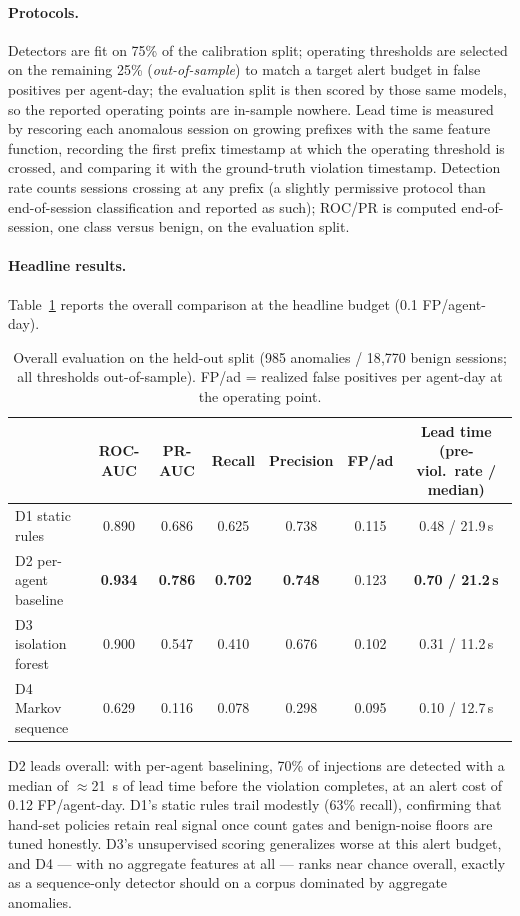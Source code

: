 \documentclass[10pt]{article}
\begin{document}
\paragraph{Protocols.} Detectors are fit on 75\% of the calibration split;
operating thresholds are selected on the remaining 25\% (\emph{out-of-sample})
to match a target alert budget in false positives per agent-day; the
evaluation split is then scored by those same models, so the reported
operating points are in-sample nowhere. Lead time is measured by rescoring
each anomalous session on growing prefixes with the same feature function,
recording the first prefix timestamp at which the operating threshold is
crossed, and comparing it with the ground-truth violation timestamp.
Detection rate counts sessions crossing at any prefix (a slightly permissive
protocol than end-of-session classification and reported as such); ROC/PR is
computed end-of-session, one class versus benign, on the evaluation split.

\paragraph{Headline results.} Table~\ref{tab:overall} reports the overall
comparison at the headline budget (0.1 FP/agent-day).

\begin{table}[t]
\centering\small
\caption{Overall evaluation on the held-out split (985 anomalies / 18{,}770
benign sessions; all thresholds out-of-sample). FP/ad = realized false
positives per agent-day at the operating point.}
\label{tab:overall}
\begin{tabular}{@{}lcccccc@{}}
\toprule
 & ROC-AUC & PR-AUC & Recall & Precision & FP/ad & Lead time (pre-viol.\ rate / median) \\
\midrule
D1 static rules      & 0.890 & 0.686 & 0.625 & 0.738 & 0.115 & 0.48 / 21.9\,s \\
D2 per-agent baseline& \textbf{0.934} & \textbf{0.786} & \textbf{0.702} & \textbf{0.748} & 0.123 & \textbf{0.70 / 21.2\,s} \\
D3 isolation forest  & 0.900 & 0.547 & 0.410 & 0.676 & 0.102 & 0.31 / 11.2\,s \\
D4 Markov sequence   & 0.629 & 0.116 & 0.078 & 0.298 & 0.095 & 0.10 / 12.7\,s \\
\bottomrule
\end{tabular}
\end{table}

\noindent D2 leads overall: with per-agent baselining, 70\% of injections are
detected with a median of $\approx$21~s of lead time before the violation
completes, at an alert cost of 0.12 FP/agent-day. D1's static rules trail
modestly (63\% recall), confirming that hand-set policies retain real signal
once count gates and benign-noise floors are tuned honestly. D3's
unsupervised scoring generalizes worse at this alert budget, and D4 --- with
no aggregate features at all --- ranks near chance overall, exactly as a
sequence-only detector should on a corpus dominated by aggregate anomalies.
\end{document}
